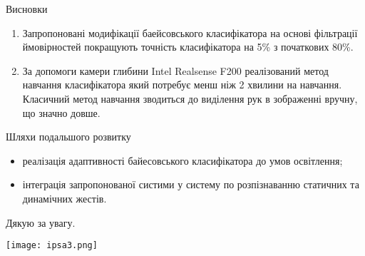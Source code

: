 \begin{frame}{Висновки}
	\manimate
	\begin{enumerate}
		\item Запропоновані модифікації баейсовського класифікатора на основі фільтрації ймовірностей покращують точність класифікатора на 5\% з початкових 80\%.
		\item За допомоги камери глибини Intel Realsense F200 реалізований метод навчання класифікатора який потребує менш ніж 2 хвилини на навчання. Класичний метод навчання зводиться до виділення рук в зображенні вручну, що значно довше.
	\end{enumerate}
\end{frame}

\begin{frame}{Шляхи подальшого розвитку}
	\manimate
	\begin{itemize}
		\item реалізація адаптивності байесовського класифікатора до умов освітлення;
		\item інтеграція запропонованої систими у систему по розпізнаванню статичних та динамічних жестів.
	\end{itemize}
\end{frame}


\begin{frame}
	\manimate
	\centering
	\Large Дякую за увагу.
	
	\begin{center}
		\texttt{[image: ipsa3.png]}
	\end{center}
\end{frame}